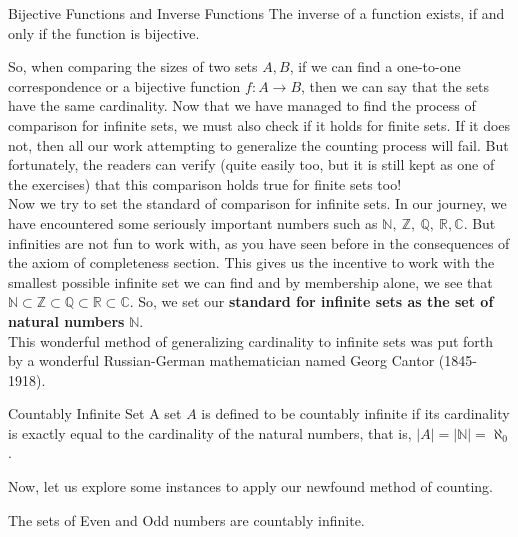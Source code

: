 \begin{Theorem}{Bijective Functions and Inverse Functions}\label{bijective_and_inverse}
    The inverse of a function exists, if and only if the function is bijective.
\end{Theorem}
\noindent So, when comparing the sizes of two sets $A, B$, if we can find a one-to-one correspondence or a bijective function $f: A \to B$, then we can say that the sets have the same cardinality. Now that we have managed to find the process of comparison for infinite sets, we must also check if it holds for finite sets. If it does not, then all our work attempting to generalize the counting process will fail. But fortunately, the readers can verify (quite easily too, but it is still kept as one of the exercises) that this comparison holds true for finite sets too!\\
Now we try to set the standard of comparison for infinite sets. In our journey, we have encountered some seriously important numbers such as $\mathbb{N,\ Z,\ Q,\ R, C}$. But infinities are not fun to work with, as you have seen before in the consequences of the axiom of completeness section. This gives us the incentive to work with the smallest possible infinite set we can find and by membership alone, we see that $\mathbb{N\subset Z\subset Q\subset R\subset C}$. So, we set our \textbf{standard for infinite sets as the set of natural numbers} $\pmb{\mathbb{N}}$.\\
This wonderful method of generalizing cardinality to infinite sets was put forth by a wonderful Russian-German mathematician named Georg Cantor (1845-1918).
\begin{Definition}{Countably Infinite Set}\label{countably_infinite_set}
    A set $A$ is defined to be countably infinite if its cardinality is exactly equal to the cardinality of the natural numbers, that is, $|A|=|\mathbb{N}|=\aleph_0$.
\end{Definition}
\noindent Now, let us explore some instances to apply our newfound method of counting.
\begin{Example}
    The sets of Even and Odd numbers are countably infinite.
\end{Example}
